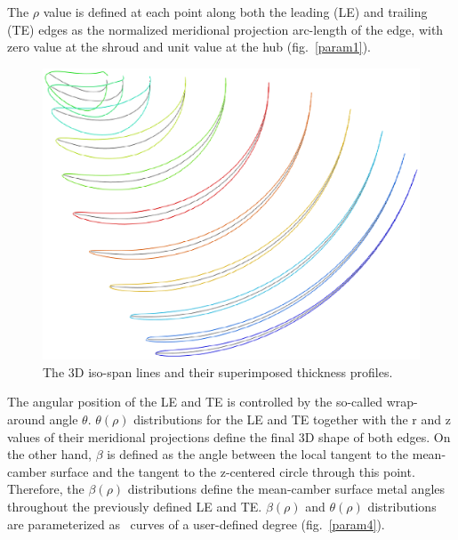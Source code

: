 
The $\rho$ value is defined at each point along both the leading (LE) and trailing (TE) edges as the normalized meridional projection arc-length of the edge, with zero value at the shroud and unit value at the hub (fig.\ \ref{param1}). 

\begin{figure}[h!]
\centering
\includegraphics[width=120mm]{param3.eps} 
\caption{The 3D iso-span lines and their superimposed thickness profiles.}
\label{param3}
\end{figure}

The angular position of the LE and TE is controlled by the so-called wrap-around angle $\theta$. %
$\theta(\rho)$ distributions for the LE and TE together with the r and z values of their meridional projections define the final 3D shape of both edges. On the other hand, $\beta$ is defined as the angle between the local tangent to the mean-camber surface and the tangent to the z-centered circle through this point. Therefore, the $\beta(\rho)$ distributions define the mean-camber surface metal angles throughout the previously defined LE and TE. $\beta(\rho)$ and $\theta(\rho)$ distributions are parameterized as \Bezier\ curves of a user-defined degree (fig.\ \ref{param4}).  


